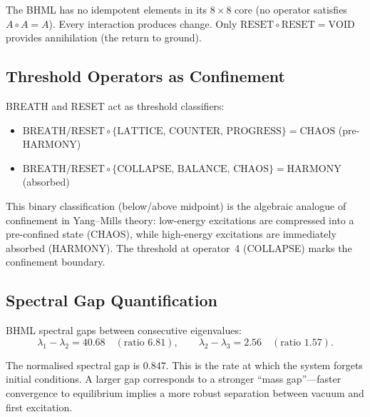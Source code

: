\documentclass[11pt]{article}
\begin{document}
The BHML has no idempotent elements in its $8\times 8$ core (no
operator satisfies $A \circ A = A$). Every interaction produces
change. Only $\text{RESET} \circ \text{RESET} = \text{VOID}$ provides
annihilation (the return to ground).

\subsection{Threshold Operators as Confinement}
\label{ssec:threshold-confinement}

BREATH and RESET act as threshold classifiers:
\begin{itemize}
  \item $\text{BREATH/RESET} \circ
    \{\text{LATTICE},\, \text{COUNTER},\, \text{PROGRESS}\}
    = \text{CHAOS}$ (pre-HARMONY)
  \item $\text{BREATH/RESET} \circ
    \{\text{COLLAPSE},\, \text{BALANCE},\, \text{CHAOS}\}
    = \text{HARMONY}$ (absorbed)
\end{itemize}

This binary classification (below/above midpoint) is the algebraic
analogue of confinement in Yang--Mills theory: low-energy excitations
are compressed into a pre-confined state (CHAOS), while high-energy
excitations are immediately absorbed (HARMONY). The threshold at
operator~4 (COLLAPSE) marks the confinement boundary.

\subsection{Spectral Gap Quantification}
\label{ssec:spectral-gap}

BHML spectral gaps between consecutive eigenvalues:
\[
  \lambda_1 - \lambda_2 = 40.68 \quad (\text{ratio } 6.81), \qquad
  \lambda_2 - \lambda_3 = 2.56  \quad (\text{ratio } 1.57).
\]

The normalised spectral gap is $0.847$. This is the rate at which the
system forgets initial conditions. A larger gap corresponds to a
stronger ``mass gap''---faster convergence to equilibrium implies a
more robust separation between vacuum and first excitation.

\end{document}

